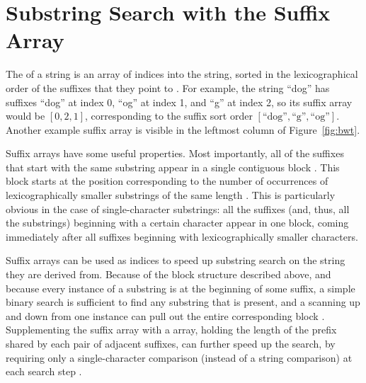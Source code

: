 \documentclass[11pt,proposal]{ucthesis}
\begin{document}
    
    
    
\section{Substring Search with the Suffix Array}

The  of a string is an array of indices into the string, sorted in the lexicographical order of the suffixes that they point to \cite{manber1993suffix}. For example, the string ``dog'' has suffixes ``dog'' at index 0, ``og'' at index 1, and ``g'' at index 2, so its suffix array would be $[0, 2, 1]$, corresponding to the suffix sort order $[\textrm{``dog''}, \textrm{``g''}, \textrm{``og''}]$. Another example suffix array is visible in the leftmost column of Figure~\ref{fig:bwt}.

Suffix arrays have some useful properties. Most importantly, all of the suffixes that start with the same substring appear in a single contiguous block \cite{ferragina2000opportunistic}. This block starts at the position corresponding to the number of occurrences of lexicographically smaller substrings of the same length \cite{ferragina2000opportunistic}. This is particularly obvious in the case of single-character substrings: all the suffixes (and, thus, all the substrings) beginning with a certain character appear in one block, coming immediately after all suffixes beginning with lexicographically smaller characters.

Suffix arrays can be used as indices to speed up substring search on the string they are derived from. Because of the block structure described above, and because every instance of a substring is at the beginning of some suffix, a simple binary search is sufficient to find any substring that is present, and a scanning up and down from one instance can pull out the entire corresponding block \cite{manber1993suffix}. Supplementing the suffix array with a  array, holding the length of the prefix shared by each pair of adjacent suffixes, can further speed up the search, by requiring only a single-character comparison (instead of a string comparison) at each search step \cite{manber1993suffix}.


\end{document}

